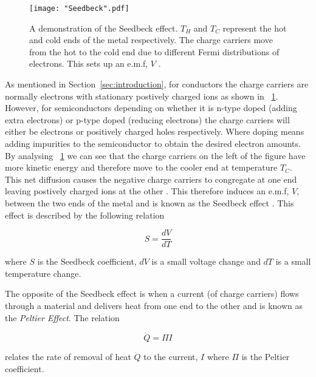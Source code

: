 \documentclass{article}
\newcommand{\figref}[2][\figurename~]{#1\ref{#2}}
\newcommand{\secref}[2][Section~]{#1\ref{#2}}
\begin{document}
\begin{figure}[h]
\centering
\texttt{[image: "Seedbeck".pdf]}
\caption{A demonstration of the Seedbeck effect. $T_H$ and $T_C$ represent the hot and cold ends of the metal respectively. The charge carriers move from the hot to the cold end due to different Fermi distributions of electrons. This sets up an e.m.f, $V$ \cite{Paper02}.}
\label{fig:Seedbeck}
\end{figure}

\vspace{2mm}
\noindent
As mentioned in \secref{sec:introduction}, for conductors the charge carriers are normally electrons with stationary postively charged ions as shown in \figref{fig:Seedbeck}. However, for semiconductors depending on whether it is n-type doped (adding extra electrons) or p-type doped (reducing electrons) the charge carriers will either be electrons or positively charged holes respectively. Where doping means adding impurities to the semiconductor to obtain the desired electron amounts. By analysing \figref{fig:Seedbeck} we can see that the charge carriers on the left of the figure have more kinetic energy and therefore move to the cooler end at temperature $T_C$. This net diffusion causes the negative charge carriers to congregate at one end leaving postively charged ions at the other \cite{Paper02}. This therefore induces an e.m.f, $V$, between the two ends of the metal and is known as the Seedbeck effect \cite{Paper02}. This effect is described by the following relation \cite{Paper02} 

\begin{equation}
\label{eq:Seedbeck-coeff}
S = \frac{dV}{dT}
\end{equation}

\vspace{2mm}
\noindent
where $S$ is the Seedbeck coefficient, $dV$ is a small voltage change and $dT$ is a small temperature change. 

\vspace{2mm}
\noindent
The opposite of the Seedbeck effect is when a current (of charge carriers) flows through a material and delivers heat from one end to the other and is known as the \textit{Peltier Effect}. The relation

\begin{equation}
\label{eq:Peltier-coeff}
\dot{Q}  = \Pi I
\end{equation}

\vspace{2mm}
\noindent
relates the rate of removal of heat $\dot{Q}$ to the current, $I$ \cite{Paper02} where $\Pi$ is the Peltier coefficient.
\end{document}
